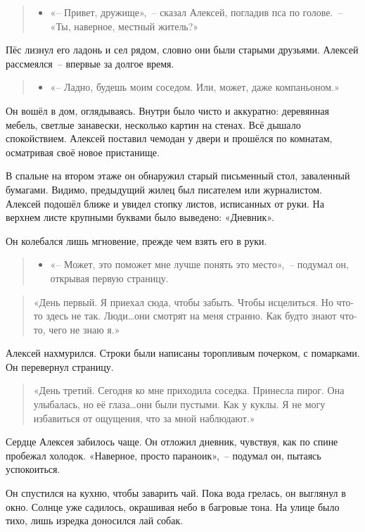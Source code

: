 \documentclass[12pt,a4paper]{book}
\newenvironment{dialogue}{\begin{quote}\itshape\begin{itemize}\item[]}{\end{itemize}\end{quote}}
\begin{document}
\begin{dialogue}
«-- Привет, дружище»,~-- сказал Алексей, погладив пса по голове.~-- «Ты, наверное, местный житель?»
\end{dialogue}

Пёс лизнул его ладонь и сел рядом, словно они были старыми друзьями. Алексей рассмеялся~-- впервые за долгое время.

\begin{dialogue}
«-- Ладно, будешь моим соседом. Или, может, даже компаньоном.»
\end{dialogue}

Он вошёл в дом, оглядываясь. Внутри было чисто и аккуратно: деревянная мебель, светлые занавески, несколько картин на стенах. Всё дышало спокойствием. Алексей поставил чемодан у двери и прошёлся по комнатам, осматривая своё новое пристанище.

В спальне на втором этаже он обнаружил старый письменный стол, заваленный бумагами. Видимо, предыдущий жилец был писателем или журналистом. Алексей подошёл ближе и увидел стопку листов, исписанных от руки. На верхнем листе крупными буквами было выведено: «Дневник».

Он колебался лишь мгновение, прежде чем взять его в руки.
\begin{dialogue}
«-- Может, это поможет мне лучше понять это место»,~-- подумал он, открывая первую страницу.
\end{dialogue}

\begin{quote}
«День первый. Я приехал сюда, чтобы забыть. Чтобы исцелиться. Но что-то здесь не так. Люди\ldots они смотрят на меня странно. Как будто знают что-то, чего не знаю я.»
\end{quote}

Алексей нахмурился. Строки были написаны торопливым почерком, с помарками. Он перевернул страницу.
\begin{quote}
«День третий. Сегодня ко мне приходила соседка. Принесла пирог. Она улыбалась, но её глаза\ldots они были пустыми. Как у куклы. Я не могу избавиться от ощущения, что за мной наблюдают.»
\end{quote}

Сердце Алексея забилось чаще. Он отложил дневник, чувствуя, как по спине пробежал холодок. «Наверное, просто параноик»,~-- подумал он, пытаясь успокоиться.

Он спустился на кухню, чтобы заварить чай. Пока вода грелась, он выглянул в окно. Солнце уже садилось, окрашивая небо в багровые тона. На улице было тихо, лишь изредка доносился лай собак.
\end{document}
